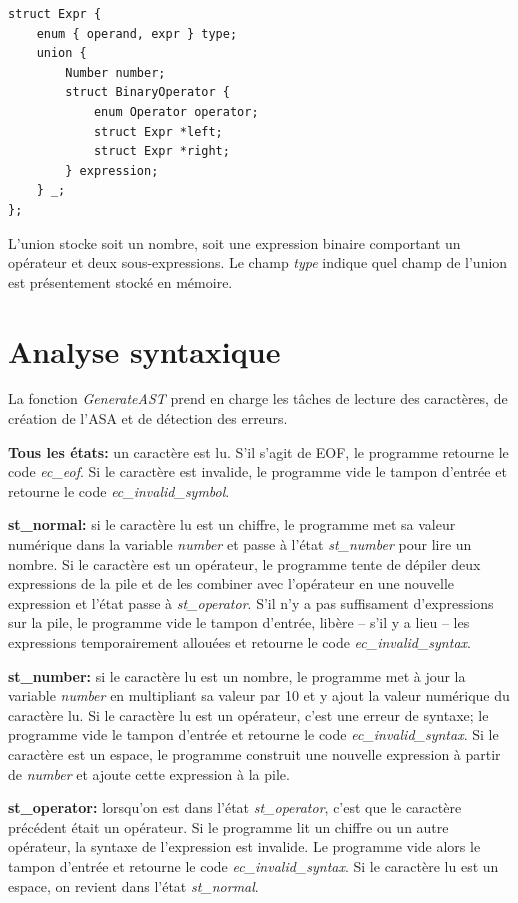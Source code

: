 \documentclass[10pt]{report}
\begin{document}
\begin{verbatim}
struct Expr {
    enum { operand, expr } type;
    union {
        Number number;
        struct BinaryOperator {
            enum Operator operator;
            struct Expr *left;
            struct Expr *right;
        } expression;
    } _;
};
\end{verbatim}

L'union stocke soit un nombre, soit une expression binaire comportant un
opérateur et deux sous-expressions.  Le champ \emph{type} indique quel champ
de l'union est présentement stocké en mémoire.


\newpage

\section{Analyse syntaxique}

La fonction \emph{GenerateAST} prend en charge les tâches de lecture des
caractères, de création de l'ASA et de détection des erreurs.

\textbf{Tous les états:} un caractère est lu.  S'il s'agit de EOF, le
programme retourne le code \emph{ec\_eof}.  Si le caractère est invalide, le
programme vide le tampon d'entrée et retourne le code
\emph{ec\_invalid\_symbol}.

\textbf{st\_normal:} si le caractère lu est un chiffre, le programme met sa
valeur numérique dans la variable \emph{number} et passe à l'état
\emph{st\_number} pour lire un nombre.  Si le caractère est un opérateur, le
programme tente de dépiler deux expressions de la pile et de les combiner avec
l'opérateur en une nouvelle expression et l'état passe à \emph{st\_operator}.
S'il n'y a pas suffisament d'expressions sur la pile, le programme vide le
tampon d'entrée, libère -- s'il y a lieu -- les expressions temporairement
allouées et retourne le code \emph{ec\_invalid\_syntax}.

\textbf{st\_number:} si le caractère lu est un nombre, le programme met à jour
la variable \emph{number} en multipliant sa valeur par 10 et y ajout la valeur
numérique du caractère lu.  Si le caractère lu est un opérateur, c'est une
erreur de syntaxe; le programme vide le tampon d'entrée et retourne le code
\emph{ec\_invalid\_syntax}.  Si le caractère est un espace, le programme
construit une nouvelle expression à partir de \emph{number} et ajoute cette
expression à la pile.

\textbf{st\_operator:} lorsqu'on est dans l'état \emph{st\_operator}, c'est
que le caractère précédent était un opérateur.  Si le programme lit un chiffre
ou un autre opérateur, la syntaxe de l'expression est invalide.  Le programme
vide alors le tampon d'entrée et retourne le code \emph{ec\_invalid\_syntax}.
Si le caractère lu est un espace, on revient dans l'état \emph{st\_normal}.
\end{document}
